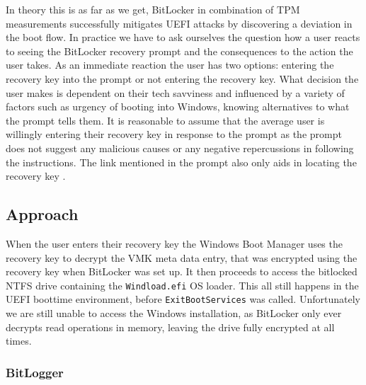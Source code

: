 In theory this is as far as we get, BitLocker in combination of \ac{TPM} measurements successfully mitigates \ac{UEFI} attacks by discovering a deviation in the boot flow.
In practice we have to ask ourselves the question how a user reacts to seeing the BitLocker recovery prompt and the consequences to the action the user takes. As an immediate reaction the user has two options: entering the recovery key into the prompt or not entering the recovery key.
What decision the user makes is dependent on their tech savviness and influenced by a variety of factors such as urgency of booting into Windows, knowing alternatives to what the prompt tells them.
It is reasonable to assume that the average user is willingly entering their recovery key in response to the prompt as the prompt does not suggest any malicious causes or any negative repercussions in following the instructions. The link mentioned in the prompt also only aids in locating the recovery key \cite{microsoft-recovery-key-faq}.



\subsection{Approach}

When the user enters their recovery key the Windows Boot Manager uses the recovery key to decrypt the \ac{VMK} meta data entry, that was encrypted using the recovery key when BitLocker was set up. It then proceeds to access the bitlocked NTFS drive containing the \lstinline{Windload.efi} \ac{OS} loader. This all still happens in the UEFI boottime environment, before \lstinline{ExitBootServices} was called. Unfortunately we are still unable to access the Windows installation, as BitLocker only ever decrypts read operations in memory, leaving the drive fully encrypted at all times.

\subsubsection{BitLogger}

